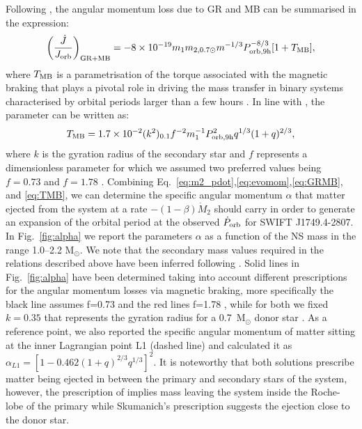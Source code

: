 \documentclass[fleqn,usenatbib]{mnras}
\newcommand{\swiftj}{SWIFT J1749.4-2807}
\begin{document}
Following \citet{Burderi:2010tk}, the angular momentum loss due to GR and MB can be summarised in the expression:
\begin{equation} 
\label{eq:GRMB}
\left(\frac{\dot{J}}{J_{\rm orb}}\right)_{\rm GR+MB}=-8\times 10^{-19}m_1 m_{2,0.7\odot}m^{-1/3}P_{\rm orb,9h}^{-8/3}[1+T_{\rm MB}],
\end{equation}
where $T_{\rm MB}$ is a parametrisation of the torque associated with the magnetic braking that plays a pivotal role in driving the mass transfer in binary systems characterised by orbital periods larger than a few hours \citep{Verbunt:1993vj}. In line with \citet[][]{Iaria:2018tq}, the parameter can be written as:
\begin{equation}
\label{eq:TMB}	
T_{\rm MB}=1.7\times 10^{-2}(k^2)_{0.1}f^{-2}m_1^{-1}P_{\rm orb,9h}^2q^{1/3}(1+q)^{2/3},
\end{equation}
where $k$ is the gyration radius of the secondary star and $f$ represents a dimensionless parameter for which we assumed two preferred values being $f=0.73$ \citep{Skumanich:1972vy} and $f=1.78$ \citep{Smith:1979vn}.
Combining Eq.~\ref{eq:m2_pdot},\ref{eq:evomom},\ref{eq:GRMB}, and \ref{eq:TMB}, we can determine the specific angular momentum $\alpha$ that matter ejected from the system at a rate $-(1-\beta)\dot{M}_2$ should carry in order to generate an expansion of the orbital period at the observed $\dot{P}_{\rm orb}$ for \swiftj{}. In Fig.~\ref{fig:alpha} we report the parameters $\alpha$ as a function of the NS mass in the range 1.0--2.2 M$_\odot$. We note that the secondary mass values required in the relations described above have been inferred following \citet{Markwardt:2010tl}. Solid lines in Fig.~\ref{fig:alpha} have been determined taking into account different prescriptions for the angular momentum losses via magnetic braking, more specifically the black line assumes f=0.73 \citep{Skumanich:1972vy} and the red lines f=1.78 \citep{Smith:1979vn}, while for both we fixed $k=0.35$ that represents the gyration radius for a 0.7~M$_\odot$ donor star \citep[see e.g.,][]{Claret:1990to}. As a reference point, we also reported the specific angular momentum of matter sitting at the inner Lagrangian point L1 (dashed line) and calculated it as $\alpha_{L1}=[1 -0.462(1 + q)^{2/3}q^{1/3}]^2$. It is noteworthy that both solutions prescribe matter being ejected in between the primary and secondary stars of the system, however, the prescription of \citet{Smith:1979vn} implies mass leaving the system inside the Roche-lobe of the primary while Skumanich's prescription suggests the ejection close to the donor star. 
\end{document}
